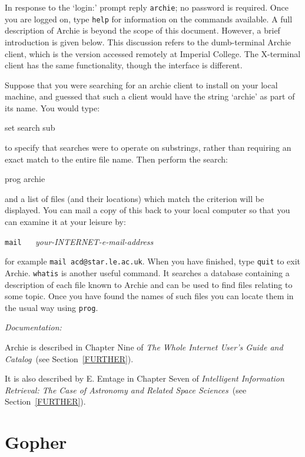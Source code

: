 \documentclass[twoside,11pt,nolof]{starlink}
\begin{document}
In response to the `login:' prompt reply \texttt{archie}; no password is
required. Once you are logged on, type \texttt{help} for information on the
commands available. A full description of Archie is beyond the scope of
this document. However, a brief introduction is given below. This
discussion refers to the dumb-terminal Archie client, which is the
version accessed remotely at Imperial College. The X-terminal client has
the same functionality, though the interface is different.

Suppose that you were searching for an archie client to install
on your local machine, and guessed that such a client would have the
string `archie' as part of its name. You would type:

\begin{terminalv}
set search sub
\end{terminalv}

to specify that searches were to operate on substrings, rather than
requiring an exact match to the entire file name. Then perform the
search:

\begin{terminalv}
prog archie
\end{terminalv}

and a list of files (and their locations) which match the criterion will
be displayed. You can mail a copy of this back to your local computer
so that you can examine it at your leisure by:

\vspace{2.0 mm}
\texttt{mail} ~~ \textit{your-INTERNET-e-mail-address}
\vspace{2.0 mm}

for example \texttt{mail acd@star.le.ac.uk}. When you have finished, type
\texttt{quit} to exit Archie. \texttt{whatis} is another useful command. It
searches a database containing a description of each file known to
Archie and can be used to find files relating to some topic. Once you
have found the names of such files you can locate them in the usual way
using \texttt{prog}.

\textit{Documentation:}

Archie is described in Chapter Nine of \textit{The Whole Internet
User's Guide and Catalog}\, (see Section~\ref{FURTHER}).

It is also described by E. Emtage in Chapter Seven of \textit{Intelligent
Information Retrieval: The Case of Astronomy and Related Space
Sciences}\, (see Section~\ref{FURTHER}).


\section{Gopher
\label{GOPHER}}
\end{document}
